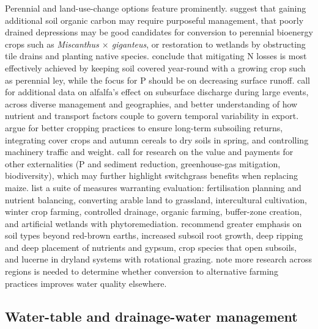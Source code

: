 Perennial and land-use-change options feature prominently. \textcite{Huang2023} suggest that gaining additional soil organic carbon may require purposeful management, that poorly drained depressions may be good candidates for conversion to perennial bioenergy crops such as \textit{Miscanthus $\times$ giganteus}, or restoration to wetlands by obstructing tile drains and planting native species. \textcite{Norberg2022} conclude that mitigating N losses is most effectively achieved by keeping soil covered year-round with a growing crop such as perennial ley, while the focus for P should be on decreasing surface runoff. \textcite{Arrueta2025} call for additional data on alfalfa's effect on subsurface discharge during large events, across diverse management and geographies, and better understanding of how nutrient and transport factors couple to govern temporal variability in export. \textcite{Djiemon2019} argue for better cropping practices to ensure long-term subsoiling returns, integrating cover crops and autumn cereals to dry soils in spring, and controlling machinery traffic and weight. \textcite{Woodbury2018} call for research on the value and payments for other externalities (P and sediment reduction, greenhouse-gas mitigation, biodiversity), which may further highlight switchgrass benefits when replacing maize. \textcite{Siksnane2017} list a suite of measures warranting evaluation: fertilisation planning and nutrient balancing, converting arable land to grassland, intercultural cultivation, winter crop farming, controlled drainage, organic farming, buffer-zone creation, and artificial wetlands with phytoremediation. \textcite{GARDNER1992} recommend greater emphasis on soil types beyond red-brown earths, increased subsoil root growth, deep ripping and deep placement of nutrients and gypsum, crop species that open subsoils, and lucerne in dryland systems with rotational grazing. \textcite{Oquist2007} note more research across regions is needed to determine whether conversion to alternative farming practices improves water quality elsewhere.

\subsection{Water-table and drainage-water management}

